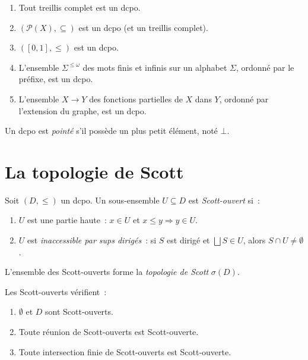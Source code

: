 \begin{exemple}
\begin{enumerate}
  \item Tout treillis complet est un dcpo.
  \item $(\mathcal{P}(X), \subseteq)$ est un dcpo (et un treillis complet).
  \item $([0,1], \leq)$ est un dcpo.
  \item L'ensemble $\Sigma^{\leq\omega}$ des mots finis et infinis sur un alphabet
    $\Sigma$, ordonn\'e par le pr\'efixe, est un dcpo.
  \item L'ensemble $X \to Y$ des fonctions partielles de $X$ dans $Y$, ordonn\'e par
    l'extension du graphe, est un dcpo.
\end{enumerate}
\end{exemple}

\begin{definition}
Un dcpo est \emph{point\'e} s'il poss\`ede un plus petit \'el\'ement, not\'e $\bot$.
\end{definition}

\section{La topologie de Scott}

\begin{definition}
Soit $(D,\leq)$ un dcpo. Un sous-ensemble $U \subseteq D$ est \emph{Scott-ouvert} si~:
\begin{enumerate}
  \item $U$ est une partie haute~: $x \in U$ et $x \leq y \Rightarrow y \in U$.
  \item $U$ est \emph{inaccessible par sups dirig\'es}~: si $S$ est dirig\'e et
    $\bigsqcup S \in U$, alors $S \cap U \neq \emptyset$.
\end{enumerate}
L'ensemble des Scott-ouverts forme la \emph{topologie de Scott} $\sigma(D)$.
\end{definition}

\begin{proposition}
Les Scott-ouverts v\'erifient~:
\begin{enumerate}
  \item $\emptyset$ et $D$ sont Scott-ouverts.
  \item Toute r\'eunion de Scott-ouverts est Scott-ouverte.
  \item Toute intersection finie de Scott-ouverts est Scott-ouverte.
\end{enumerate}
\end{proposition}

